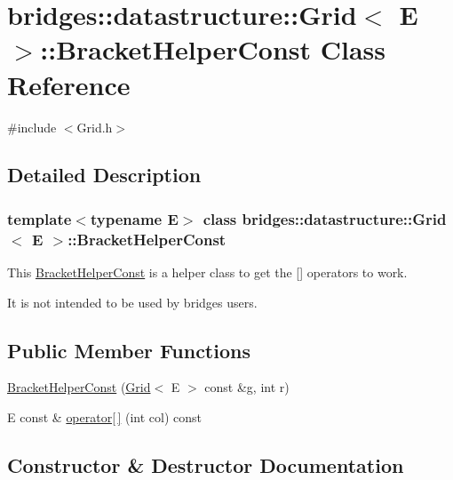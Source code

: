 \hypertarget{classbridges_1_1datastructure_1_1_grid_1_1_bracket_helper_const}{}\section{bridges\+:\+:datastructure\+:\+:Grid$<$ E $>$\+:\+:Bracket\+Helper\+Const Class Reference}
\label{classbridges_1_1datastructure_1_1_grid_1_1_bracket_helper_const}


{\ttfamily \#include $<$Grid.\+h$>$}



\subsection{Detailed Description}
\subsubsection*{template$<$typename E$>$\newline
class bridges\+::datastructure\+::\+Grid$<$ E $>$\+::\+Bracket\+Helper\+Const}

This \hyperlink{classbridges_1_1datastructure_1_1_grid_1_1_bracket_helper_const}{Bracket\+Helper\+Const} is a helper class to get the \mbox{[}\mbox{]} operators to work. 

It is not intended to be used by bridges users. \subsection*{Public Member Functions}
\begin{DoxyCompactItemize}
\item 
\hyperlink{classbridges_1_1datastructure_1_1_grid_1_1_bracket_helper_const_aab84943f8768214184bb6845864300a8}{Bracket\+Helper\+Const} (\hyperlink{classbridges_1_1datastructure_1_1_grid}{Grid}$<$ E $>$ const \&g, int r)
\item 
E const  \& \hyperlink{classbridges_1_1datastructure_1_1_grid_1_1_bracket_helper_const_a3a0571d419200f98e525441e16bb707c}{operator\mbox{[}$\,$\mbox{]}} (int col) const
\end{DoxyCompactItemize}


\subsection{Constructor \& Destructor Documentation}
\mbox{\label{classbridges_1_1datastructure_1_1_grid_1_1_bracket_helper_const_aab84943f8768214184bb6845864300a8}} 
